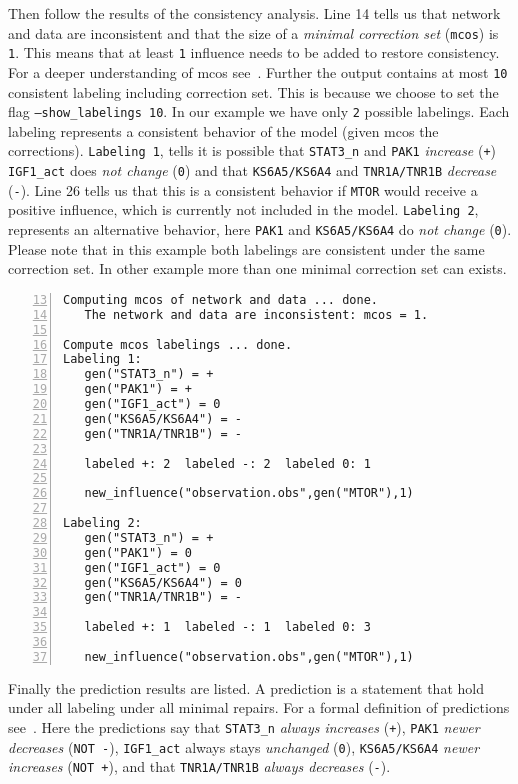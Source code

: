 \documentclass{article}
\begin{document}
Then follow the results of the consistency analysis.
Line 14 tells us that network and data are inconsistent 
and that the size of a \emph{minimal correction set} (\texttt{mcos}) is \texttt{1}.
This means that at least \texttt{1} influence needs to be added to restore consistency.
For a deeper understanding of mcos see~\cite{samaga13a}.
Further the output contains at most \texttt{10} consistent labeling including correction set. 
This is because we choose to set the flag \texttt{--show\_labelings 10}.
In our example we have only \texttt{2} possible labelings. 
Each labeling represents a consistent behavior of the model (given mcos the corrections).
\texttt{Labeling 1},
tells it is possible that 
\texttt{STAT3\_n} and \texttt{PAK1} \emph{increase} (\texttt{+})
\texttt{IGF1\_act} does \emph{not change} (\texttt{0}) and that
\texttt{KS6A5/KS6A4} and \texttt{TNR1A/TNR1B} \emph{decrease} (\texttt{-}).
Line 26 tells us that this is a consistent behavior if \texttt{MTOR} would receive a positive influence, 
which is currently not included in the model.
\texttt{Labeling 2}, represents an alternative behavior,
 here  \texttt{PAK1} and \texttt{KS6A5/KS6A4} do \emph{not change} (\texttt{0}).
Please note that in this example both labelings are consistent under the same correction set.
In other example more than one minimal correction set can exists.

\begin{Verbatim}[frame=single,numbers=left,firstnumber=13]  
Computing mcos of network and data ... done.
   The network and data are inconsistent: mcos = 1.
  
Compute mcos labelings ... done.
Labeling 1:
   gen("STAT3_n") = +
   gen("PAK1") = +
   gen("IGF1_act") = 0
   gen("KS6A5/KS6A4") = -
   gen("TNR1A/TNR1B") = -

   labeled +: 2  labeled -: 2  labeled 0: 1 

   new_influence("observation.obs",gen("MTOR"),1)
   
Labeling 2:
   gen("STAT3_n") = +
   gen("PAK1") = 0
   gen("IGF1_act") = 0
   gen("KS6A5/KS6A4") = 0
   gen("TNR1A/TNR1B") = -

   labeled +: 1  labeled -: 1  labeled 0: 3 
   
   new_influence("observation.obs",gen("MTOR"),1)
\end{Verbatim}

Finally the prediction results are listed.
A prediction is a statement that hold under all labeling under all minimal repairs. 
For a formal definition of predictions see~\cite{sthiele15}.
Here the predictions say that 
\texttt{STAT3\_n} \emph{always increases} (\texttt{+}),
\texttt{PAK1} \emph{newer decreases} (\texttt{NOT -}),
\texttt{IGF1\_act} always stays \emph{unchanged} (\texttt{0}),
\texttt{KS6A5/KS6A4} \emph{newer increases} (\texttt{NOT +}), and that
\texttt{TNR1A/TNR1B} \emph{always decreases} (\texttt{-}).
\end{document}
